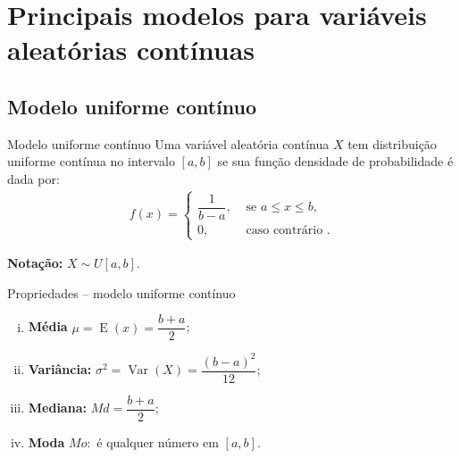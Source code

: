 \documentclass[9pt]{beamer}
\DeclareMathOperator{\espe}{E}
\DeclareMathOperator{\vari}{Var}
\begin{document}
\section{Principais modelos para variáveis aleatórias contínuas}

\subsection{Modelo uniforme contínuo}

\begin{frame}{Modelo uniforme contínuo}
 Uma variável aleatória contínua $X$ tem distribuição uniforme contínua no intervalo $[a,b]$ se sua função densidade de probabilidade é dada por:
 \begin{align*}
  f(x) = \begin{cases}
          \dfrac{1}{b-a}, & \mbox{ se } a \leq x \leq b,\\
          0, & \mbox{ caso contrário }.
         \end{cases}
 \end{align*}
\begin{figure}[ht]
\centering
\caption{}
 \end{figure}
 \vfill
 
 \textbf{Notação:} $X \sim U[a, b]$.
 
\end{frame}

\begin{frame}{Propriedades -- modelo uniforme contínuo}
\begin{enumerate}[i.]
 \item \textbf{Média} $\mu = \espe (x) = \dfrac{b+a}{2}$;
 \vfill
 
 \item \textbf{Variância:} $\sigma^2 = \vari (X) = \dfrac{(b-a)^2}{12}$;
 \vfill
 
 \item \textbf{Mediana:} $Md = \dfrac{b+a}{2}$;
 \vfill
 
 \item \textbf{Moda} $Mo:$ é qualquer número em $[a,b]$.
\end{enumerate}

\end{frame}
\end{document}
